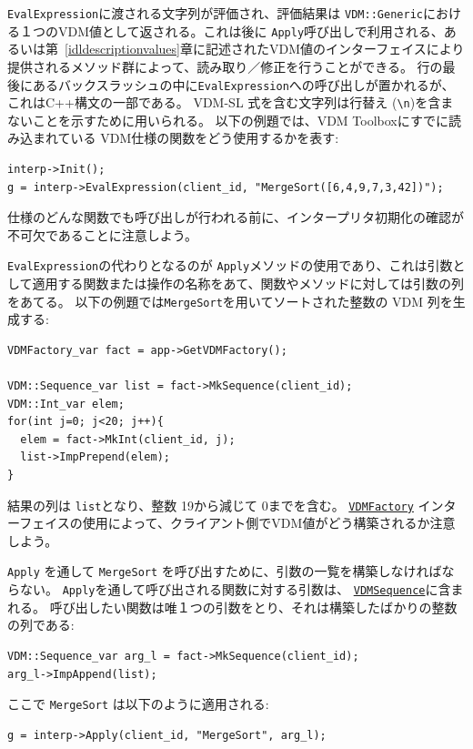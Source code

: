 \documentclass[\pformat,12pt]{jarticle}
\newcommand{\VDMFactory}{\hyperlink{interface.VDMFactory}{VDMFactory}}
\newcommand{\VDMSequence}{\hyperlink{interface.VDMSequence}{VDMSequence}}
\begin{document}
 {\tt EvalExpression}に渡される文字列が評価され、評価結果は {\tt VDM::Generic}における１つのVDM値として返される。これは後に {\tt Apply}呼び出しで利用される、あるいは第~\ref{idldescriptionvalues}章に記述されたVDM値のインターフェイスにより提供されるメソッド群によって、読み取り／修正を行うことができる。
行の最後にあるバックスラッシュの中に\texttt{EvalExpression}への呼び出しが置かれるが、これはC++構文の一部である。
 VDM-SL 式を含む文字列は行替え (\verb+\n+)を含まないことを示すために用いられる。
以下の例題では、VDM Toolboxにすでに読み込まれている VDM仕様の関数をどう使用するかを表す: 

\begin{verbatim}
interp->Init();
g = interp->EvalExpression(client_id, "MergeSort([6,4,9,7,3,42])");
\end{verbatim}

仕様のどんな関数でも呼び出しが行われる前に、インタープリタ初期化の確認が不可欠であることに注意しよう。

{\tt EvalExpression}の代わりとなるのが {\tt  Apply}メソッドの使用であり、これは引数として適用する関数または操作の名称をあて、関数やメソッドに対しては引数の列をあてる。
以下の例題では{\tt MergeSort}を用いてソートされた整数の VDM 列を生成する:

\begin{verbatim}
VDMFactory_var fact = app->GetVDMFactory();
    
VDM::Sequence_var list = fact->MkSequence(client_id);
VDM::Int_var elem;
for(int j=0; j<20; j++){
  elem = fact->MkInt(client_id, j);
  list->ImpPrepend(elem);
}
\end{verbatim}

結果の列は {\tt list}となり、整数 19から減じて 0までを含む。 
 {\tt \VDMFactory} インターフェイスの使用によって、クライアント側でVDM値がどう構築されるか注意しよう。

{\tt Apply} を通して {\tt MergeSort} を呼び出すために、引数の一覧を構築しなければならない。
{\tt Apply}を通して呼び出される関数に対する引数は、  {\tt  \VDMSequence}に含まれる。
呼び出したい関数は唯１つの引数をとり、それは構築したばかりの整数の列である:

\begin{verbatim}
VDM::Sequence_var arg_l = fact->MkSequence(client_id);
arg_l->ImpAppend(list);
\end{verbatim}

ここで \texttt{MergeSort} は以下のように適用される:

\begin{verbatim}
g = interp->Apply(client_id, "MergeSort", arg_l);
\end{verbatim}
\end{document}
